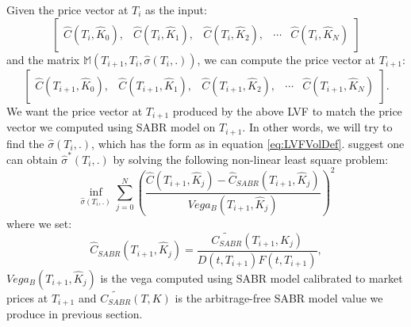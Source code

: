 \documentclass[letterpaper,12pt,titlepage,oneside,final]{book}
\numberwithin{equation}{section}
\theoremstyle{definition}
\begin{document}
Given the price vector at $T_{i}$ as the input:
\[\begin{bmatrix}
\widehat{C}(T_{i},\widehat{K}_0),&
\widehat{C}(T_{i},\widehat{K}_1),&
\widehat{C}(T_{i},\widehat{K}_2),&
\cdots&
\widehat{C}(T_{i},\widehat{K}_{N})
\end{bmatrix}\] and the matrix $\mathcal{\mathbb{M}}(T_{i+1},T_{i}, \widehat{\sigma}(T_i,.))$, we can compute  the price vector at $T_{i+1}$:
\[
\begin{bmatrix}
\widehat{C}(T_{i+1},\widehat{K}_0),&
\widehat{C}(T_{i+1},\widehat{K}_1),&
\widehat{C}(T_{i+1},\widehat{K}_2),&
\cdots&
\widehat{C}(T_{i+1},\widehat{K}_{N})
\end{bmatrix}.
\]
We want  the price vector at $T_{i+1}$ produced by the above LVF to match the price vector we computed using SABR model on $T_{i+1}$. In other words, we will try to find the $\widehat{\sigma}(T_i,.)$, which has the form as in equation \eqref{eq:LVFVolDef}. \citet{andreasen2010volatility} suggest one can obtain $\widehat{\sigma}^*(T_i,.)$ by solving the following non-linear least square problem:
\begin{equation}
\inf_{\widehat{\sigma}(T_i,.)} \sum_{j=0}^{N}(\frac{\widehat{C}(T_{i+1},\widehat{K}_j)-\widehat{C}_{SABR}(T_{i+1},\widehat{K}_j)}{Vega_{B}(T_{i+1},\widehat{K}_j)})^2
\label{eq:LVFCal}
\end{equation}
where we set: 
\[
\widehat{C}_{SABR}(T_{i+1},\widehat{K}_j)=\frac{\widetilde {C_{SABR}}(T_{i+1},K_j)}{D(t,T_{i+1})F(t,T_{i+1})},
\] $Vega_{B}(T_{i+1},\widehat{K}_j)$ is the  vega computed using SABR model calibrated to market prices at $T_{i+1}$ and $\widetilde {C_{SABR}}(T,K)$ is the arbitrage-free SABR model value we produce in previous section.
\end{document}
